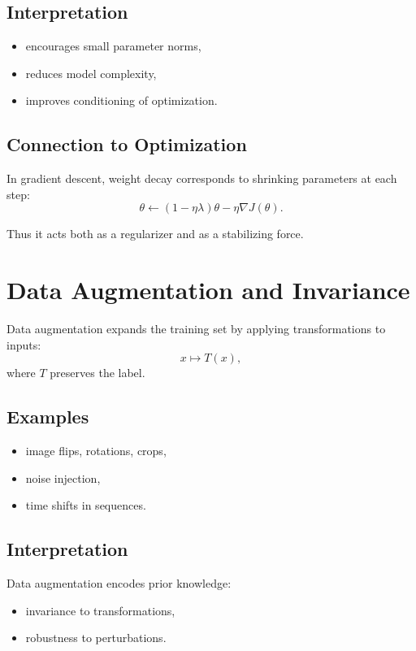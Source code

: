 \subsection{Interpretation}

\begin{itemize}
    \item encourages small parameter norms,
    \item reduces model complexity,
    \item improves conditioning of optimization.
\end{itemize}

\subsection{Connection to Optimization}

In gradient descent, weight decay corresponds to shrinking parameters at each step:
\[
\theta \leftarrow (1-\eta\lambda)\theta - \eta \nabla J(\theta).
\]

Thus it acts both as a regularizer and as a stabilizing force.

\section{Data Augmentation and Invariance}

Data augmentation expands the training set by applying transformations to inputs:
\[
x \mapsto T(x),
\]
where $T$ preserves the label.

\subsection{Examples}

\begin{itemize}
    \item image flips, rotations, crops,
    \item noise injection,
    \item time shifts in sequences.
\end{itemize}

\subsection{Interpretation}

Data augmentation encodes prior knowledge:
\begin{itemize}
    \item invariance to transformations,
    \item robustness to perturbations.
\end{itemize}

